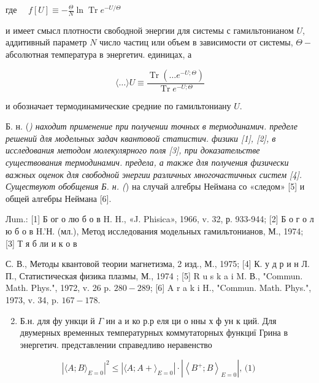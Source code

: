 \documentclass[10pt]{article}
\begin{document}
где $\quad f[U] \equiv-\frac{\Theta}{N} \ln \operatorname{Tr} e^{-U / \Theta}$



и имеет смысл плотности свободной энергии для системы с гамильтонианом $U$, аддитивный параметр $N$ число частиц или объем в зависимости от системы, $\Theta-$ абсолютная температура в энергетич. единицах, а



\[

\langle\ldots\rangle U \equiv \frac{\operatorname{Tr}\left(\ldots e^{-U ; \Theta}\right)}{\operatorname{Tr} e^{-U ; \Theta}}

\]



и обозначает термодинамические средние по гамильтониану $U$.



Б. н. (\textit{) находит применение при получении точных в термодинамич. пределе решений для модельных задач квантовой статистич. физики [1], [2], в исследования методом молекулярного поля [3], при доказательстве существования термодинамич. предела, а также для получения физически важных оценок для свободной энергии различных многочастичных систем [4]. Существуют обобщения Б. н. (}) на случай алгебры Неймана со «следом» [5] и общей алгебры Неймана [6].



Лum.: [1] Б ог о лю б о в H. H., «J. Phisica», 1966, v. 32, р. 933-944; [2] Б о г о л ю б о в H.'Н. (мл.), Метод исследования модельных гамильтонианов, М., 1974; [3] Т я б ли и к о в

С. В., Методы квантовой теории магнетизма, 2 изд., М., 1975; [4] К. у д р и н Л. П., Статистическая физика плазмы, М., 1974 ; [5] R u s k a i M. В., "Commun. Math. Phys.", 1972, v. 26 p. $280-289$; [6] A r a k i H., "Commun. Math. Phys.", 1973, v. 34, p. $167-178$.



\begin{enumerate}

  \setcounter{enumi}{1}

  \item Б.н. для фу ункци й $\Gamma$ ин а и ко р.р еля ци о нны х ф ун к ций. Для двумерных временных температурных коммутаторных функциї Грина в энергетич. представлении справедливо неравенство

\end{enumerate}



\[

\left|\langle A ; B\rangle_{E=0}\right|^{2} \leqslant\left|\langle A ; A+\rangle_{E=0}\right| \cdot\left|\left\langle B^{+} ; B\right\rangle_{E=0}\right| \text {, (1) }

\]
\end{document}
